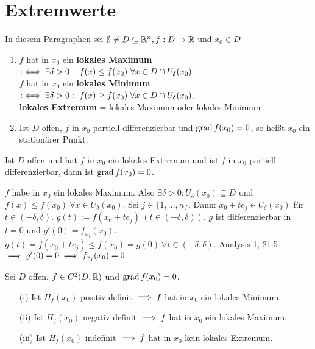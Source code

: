 \documentclass[a4paper,oneside,DIV15,BCOR12mm,chapterprefix=true,headings=onelinechapter]{scrbook}
\begin{document}
\chapter{Extremwerte}
\def\grad{\mathop{\rm grad}\nolimits}

\begin{vereinbarung}
In diesem Paragraphen sei $\emptyset\ne D \subseteq\mathbb{R}^n, f:D\to\mathbb{R}$ und $x_0\in D$
\end{vereinbarung}

\begin{definition*}
\begin{enumerate}
\item
$f$ hat in $x_0$ ein \textbf{lokales Maximum} $:\iff \exists \delta>0:\ f(x)\le f(x_0)\ \forall x\in D \cap U_\delta(x_0)$.\\
$f$ hat in $x_0$ ein \textbf{lokales Minimum} $:\iff \exists \delta>0:\ f(x)\ge f(x_0)\ \forall x\in D \cap U_\delta(x_0)$.\\
\textbf{lokales Extremum} = lokales Maximum oder lokales Minimum
\item Ist $D$ offen, $f$ in $x_0$ partiell differenzierbar und $\grad f(x_0)=0$, so heißt $x_0$ ein stationärer Punkt.
\end{enumerate}
\end{definition*}

\begin{satz}
Ist $D$ offen und hat $f$ in $x_0$ ein lokales Extremum und ist $f$ in $x_0$ partiell differenzierbar, dann ist $\grad f(x_0)=0$.
\end{satz}

\begin{beweis}
$f$ habe in $x_0$ ein lokales Maximum. Also $\exists \delta>0: U_\delta(x_0)\subseteq D$ und $f(x)\le f(x_0)\ \forall x\in U_\delta(x_0)$. Sei $j \in \{1,\ldots,n\}$. Dann: $x_0 + te_j \in U_\delta(x_0)$ für $t\in (-\delta, \delta)$. $g(t):=f(x_0 + te_j)\ (t\in (-\delta, \delta))$. $g$ ist differenzierbar in $t=0$ und $g'(0)=f_{x_j}(x_0)$. $g(t)=f(x_0+te_j)\le f(x_0)=g(0)\ \forall t\in(-\delta,\delta)$. Analysis 1, 21.5 $\implies g'(0)=0\implies f_{x_j}(x_0)=0$
\end{beweis}

\begin{satz}
Sei $D$ offen, $f\in C^2(D,\mathbb{R})$ und $\grad f(x_0)=0$.
\begin{enumerate}
\item[(i)]
Ist $H_f(x_0)$ positiv definit $\implies f$ hat in $x_0$ ein lokales Minimum.
\item[(ii)]
Ist $H_f(x_0)$ negativ definit $\implies f$ hat in $x_0$ ein lokales Maximum.
\item[(iii)]
Ist $H_f(x_0)$ indefinit $\implies f$ hat in $x_0$ \underline{kein} lokales Extremum.
\end{enumerate}
\end{satz}
\end{document}
